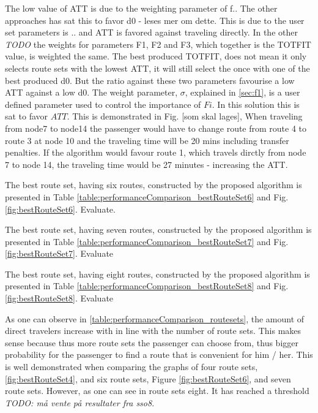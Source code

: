 The low value of ATT is due to the weighting parameter of f.. The other approaches has sat this to favor d0 - leses mer om dette. This is due to the user set parameters is .. and ATT is favored against traveling directly. In the other \emph{\color{blue} TODO} the weights for parameters F1, F2 and F3, which together is the TOTFIT value, is weighted the same. The best produced TOTFIT, does not mean it only selects route sets with the lowest ATT, it will still select the once with one of the best produced d0. But the ratio against these two parameters favourise a low ATT against a low d0. The weight parameter, $\sigma$, explained in \vref{sec:f1}, is a user defined parameter used to control the importance of $Fi$. In this solution this is sat to favor $ATT$. This is demonstrated in Fig. [som skal lages], When traveling from node7 to node14 the passenger would have to change route from route 4 to route 3 at node 10 and the traveling time will be 20 mins including transfer penalties. If the algorithm would favour route 1, which travels dirctly from node 7 to node 14, the traveling time would be 27 minutes - increasing the ATT.

The best route set, having six routes, constructed by the proposed algorithm is presented in Table \vref{table:performanceComparison_bestRouteSet6} and Fig. \vref{fig:bestRouteSet6}. 
Evaluate.

The best route set, having seven routes, constructed by the proposed algorithm is presented in Table \vref{table:performanceComparison_bestRouteSet7} and Fig. \vref{fig:bestRouteSet7}. 
Evaluate

The best route set, having eight routes, constructed by the proposed algorithm is presented in Table \vref{table:performanceComparison_bestRouteSet8} and Fig. \vref{fig:bestRouteSet8}.
Evaluate

As one can observe in \vref{table:performanceComparison_routesets}, the amount of direct travelers increase with in line with the number of route sets. This makes sense because thus more route sets the passenger can choose from, thus bigger probability for the passenger to find a route that is convenient for him / her. This is well demonstrated when comparing the graphs of four route sets, \vref{fig:bestRouteSet4}, and six route sets, Figure \vref{fig:bestRouteSet6}, and seven route sets. However, as one can see in route sets eight. It has reached a threshold \emph{\color{blue} TODO: må vente på resultater fra sso8}.

